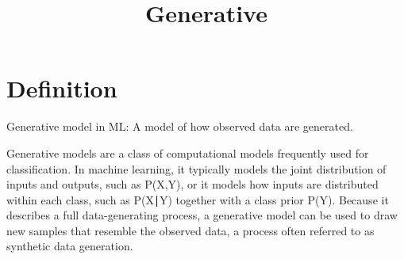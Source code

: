 \documentclass[a4paper]{article}
\title{Generative}
\date{}
\begin{document}
   \maketitle

   \section{Definition}
      Generative model in ML:
      A model of how observed data are generated.

      Generative models are a class of computational models frequently used for classification. In machine learning, it typically models the joint distribution of inputs and outputs, such as P(X,Y), or it models how inputs are distributed within each class, such as P(X∣Y) together with a class prior P(Y). Because it describes a full data-generating process, a generative model can be used to draw new samples that resemble the observed data, a process often referred to as synthetic data generation.

\end{document}
